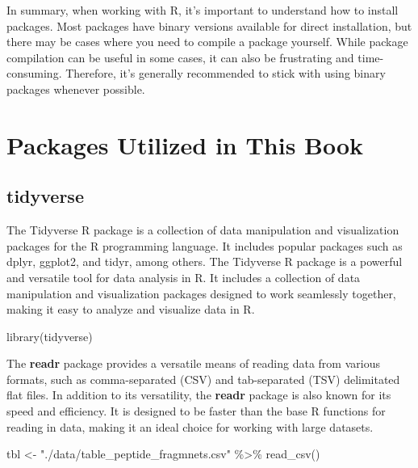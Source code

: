 \documentclass[
]{book}
\newenvironment{Shaded}{\begin{snugshade}}{\end{snugshade}}
\newcommand{\FunctionTok}[1]{\textcolor[rgb]{0.00,0.00,0.00}{#1}}
\newcommand{\NormalTok}[1]{#1}
\newcommand{\OtherTok}[1]{\textcolor[rgb]{0.56,0.35,0.01}{#1}}
\newcommand{\SpecialCharTok}[1]{\textcolor[rgb]{0.00,0.00,0.00}{#1}}
\newcommand{\StringTok}[1]{\textcolor[rgb]{0.31,0.60,0.02}{#1}}
\begin{document}
In summary, when working with R, it's important to understand how to install packages. Most packages have binary versions available for direct installation, but there may be cases where you need to compile a package yourself. While package compilation can be useful in some cases, it can also be frustrating and time-consuming. Therefore, it's generally recommended to stick with using binary packages whenever possible.

\hypertarget{packages-utilized-in-this-book}{%
\section{Packages Utilized in This Book}\label{packages-utilized-in-this-book}}

\hypertarget{tidyverse}{%
\subsection*{tidyverse}\label{tidyverse}}

The Tidyverse R package is a collection of data manipulation and visualization packages for the R programming language. It includes popular packages such as dplyr, ggplot2, and tidyr, among others. The Tidyverse R package is a powerful and versatile tool for data analysis in R. It includes a collection of data manipulation and visualization packages designed to work seamlessly together, making it easy to analyze and visualize data in R.

\begin{Shaded}
\begin{Highlighting}[]
\FunctionTok{library}\NormalTok{(tidyverse)}
\end{Highlighting}
\end{Shaded}

The \textbf{readr} package provides a versatile means of reading data from various formats, such as comma-separated (CSV) and tab-separated (TSV) delimitated flat files. In addition to its versatility, the \textbf{readr} package is also known for its speed and efficiency. It is designed to be faster than the base R functions for reading in data, making it an ideal choice for working with large datasets.

\begin{Shaded}
\begin{Highlighting}[]
\NormalTok{tbl }\OtherTok{\textless{}{-}} \StringTok{"./data/table\_peptide\_fragmnets.csv"} \SpecialCharTok{\%\textgreater{}\%} \FunctionTok{read\_csv}\NormalTok{()}
\end{Highlighting}
\end{Shaded}
\end{document}
